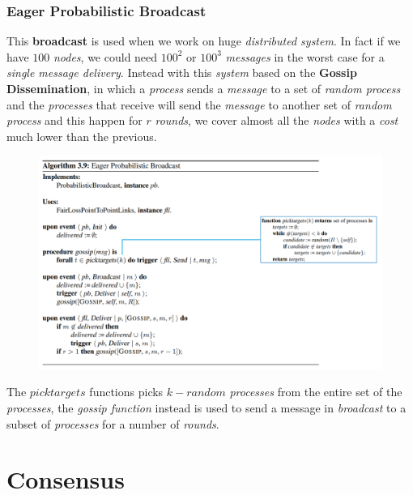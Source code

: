 \documentclass{article}
\begin{document}
\subsubsection{Eager Probabilistic Broadcast}
This \textbf{broadcast} is used when we work on huge \emph{distributed system}. In fact if we have $100$ \emph{nodes}, we could need $100^2$ or $100^3$ \emph{messages} in the worst case for a \emph{single message delivery}. Instead with this \emph{system} based on the \textbf{Gossip Dissemination}, in which a \emph{process} sends a \emph{message} to a set of \emph{random process} and the \emph{processes} that receive will send the \emph{message} to another set of \emph{random process} and this happen for $r$ \emph{rounds}, we cover almost all the \emph{nodes} with a \emph{cost} much lower than the previous. 
\begin{figure}[H]
  \centering
  \includegraphics[scale=0.7,left]{cattura41.png}
\end{figure}
The $picktargets$ functions picks $k-random$ \emph{processes} from the entire set of the \emph{processes}, the \emph{gossip function} instead is used to send a message in \emph{broadcast} to a subset of \emph{processes} for a number of \emph{rounds}. 
\section{Consensus}
\end{document}
